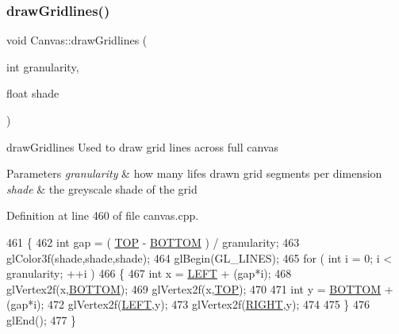\subsubsection{\texorpdfstring{draw\+Gridlines()}{drawGridlines()}}
{\footnotesize\ttfamily void Canvas\+::draw\+Gridlines (\begin{DoxyParamCaption}\item[{int}]{granularity,  }\item[{float}]{shade }\end{DoxyParamCaption})\hspace{0.3cm}{\ttfamily [private]}}



draw\+Gridlines Used to draw grid lines across full canvas 


\begin{DoxyParams}{Parameters}
{\em granularity} & how many lifes drawn grid segments per dimension \\
\hline
{\em shade} & the greyscale shade of the grid \\
\hline
\end{DoxyParams}


Definition at line 460 of file canvas.\+cpp.


\begin{DoxyCode}
461 \{
462     \textcolor{keywordtype}{int} gap = ( \hyperlink{class_canvas_a3d5a1c71903689cf817cd92ae7a2ebc9}{TOP} - \hyperlink{class_canvas_a0630c650c5daea2db5a01ce6c0954457}{BOTTOM} ) / granularity;
463     glColor3f(shade,shade,shade);
464     glBegin(GL\_LINES);
465     \textcolor{keywordflow}{for} ( \textcolor{keywordtype}{int} i = 0; i < granularity; ++i )
466     \{
467         \textcolor{keywordtype}{int} x = \hyperlink{class_canvas_a7da74603fc4232dfe00be701878d048b}{LEFT} + (gap*i);
468         glVertex2f(x,\hyperlink{class_canvas_a0630c650c5daea2db5a01ce6c0954457}{BOTTOM});
469         glVertex2f(x,\hyperlink{class_canvas_a3d5a1c71903689cf817cd92ae7a2ebc9}{TOP});
470 
471         \textcolor{keywordtype}{int} y = \hyperlink{class_canvas_a0630c650c5daea2db5a01ce6c0954457}{BOTTOM} + (gap*i);
472         glVertex2f(\hyperlink{class_canvas_a7da74603fc4232dfe00be701878d048b}{LEFT},y);
473         glVertex2f(\hyperlink{class_canvas_ab618bb921e1c0ee7c394fe3a83b17271}{RIGHT},y);
474 
475     \}
476     glEnd();
477 \}
\end{DoxyCode}
\mbox{\label{class_canvas_ae3ad5d92c9a2868b94a6570914b05366}} 
